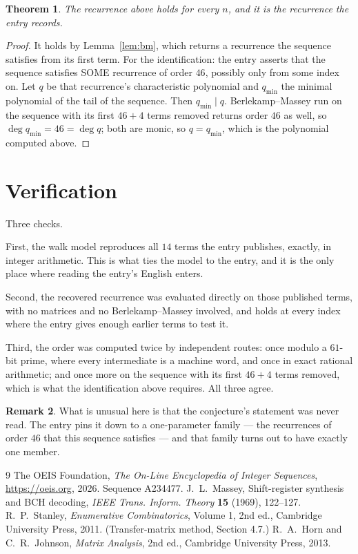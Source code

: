 \documentclass[11pt,a4paper]{article}
\theoremstyle{plain}
\newtheorem{theorem}{Theorem}
\theoremstyle{definition}
\newtheorem{remark}[theorem]{Remark}
\begin{document}
\begin{theorem}
The recurrence above holds for every $n$, and it is the recurrence the entry records.
\end{theorem}

\begin{proof}
It holds by Lemma~\ref{lem:bm}, which returns a recurrence the sequence satisfies from its
first term. For the identification: the entry asserts that the sequence satisfies SOME
recurrence of order $46$, possibly only from some index on. Let $q$ be that recurrence's
characteristic polynomial and $q_{\min}$ the minimal polynomial of the tail of the sequence.
Then $q_{\min}\mid q$. Berlekamp--Massey run on the sequence with its first $46+4$ terms
removed returns order $46$ as well, so $\deg q_{\min}=46=\deg q$; both are monic, so
$q=q_{\min}$, which is the polynomial computed above.
\end{proof}

\section{Verification}

Three checks.

First, the walk model reproduces all $14$ terms the entry publishes, exactly, in integer
arithmetic. This is what ties the model to the entry, and it is the only place where reading
the entry's English enters.

Second, the recovered recurrence was evaluated directly on those published terms, with no
matrices and no Berlekamp--Massey involved, and holds at every index where the entry gives
enough earlier terms to test it.

Third, the order was computed twice by independent routes: once modulo a $61$-bit prime, where
every intermediate is a machine word, and once in exact rational arithmetic; and once more on
the sequence with its first $46+4$ terms removed, which is what the identification above
requires. All three agree.

\begin{remark}
What is unusual here is that the conjecture's statement was never read. The entry pins it down
to a one-parameter family --- the recurrences of order $46$ that this sequence satisfies
--- and that family turns out to have exactly one member.
\end{remark}

\begin{thebibliography}{9}
 The OEIS Foundation, \emph{The On-Line Encyclopedia of Integer
Sequences}, \url{https://oeis.org}, 2026. Sequence A234477.
 J.~L.~Massey, Shift-register synthesis and BCH decoding, \emph{IEEE
Trans. Inform. Theory} \textbf{15} (1969), 122--127.
 R.~P.~Stanley, \emph{Enumerative Combinatorics}, Volume 1, 2nd ed.,
Cambridge University Press, 2011. (Transfer-matrix method, Section 4.7.)
 R.~A.~Horn and C.~R.~Johnson, \emph{Matrix Analysis}, 2nd ed., Cambridge
University Press, 2013.
\end{thebibliography}
\end{document}
